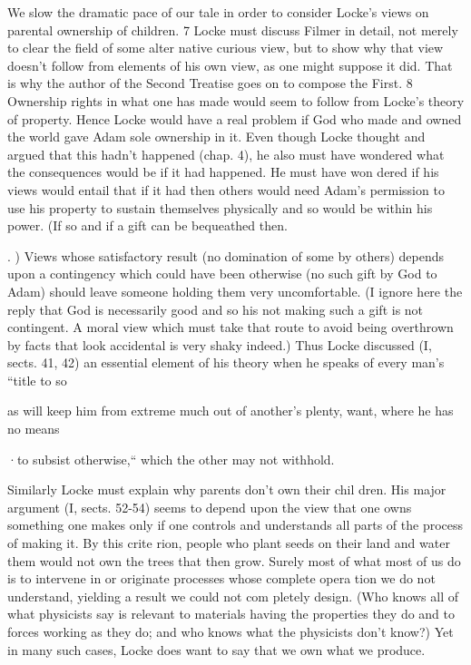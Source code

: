 \documentclass[11pt,openany]{book}
\begin{document}
We slow the dramatic pace of our tale in order to consider Locke's views on parental ownership of children. 7 Locke must discuss Filmer in detail, not merely to clear the field of some alter native curious view, but to show why that view doesn't follow from elements of his own view, as one might suppose it did. That is why the author of the Second Treatise goes on to compose the First. 8 Ownership rights in what one has made would seem to follow from Locke's theory of property. Hence Locke would have a real problem if God who made and owned the world gave Adam sole ownership in it. Even though Locke thought and argued that this hadn't happened (chap. 4), he also must have wondered what the consequences would be if it had happened. He must have won dered if his views would entail that if it had then others would need Adam's permission to use his property to sustain themselves physically and so would be within his power. (If so and if a gift can be bequeathed then. 

. ) Views whose satisfactory result (no domination of some by others) depends upon a contingency which could have been otherwise (no such gift by God to Adam) should leave someone holding them very uncomfortable. (I ignore here the reply that God is necessarily good and so his not making such a gift is not contingent. A moral view which must take that route to avoid being overthrown by facts that look accidental is very shaky indeed.) Thus Locke discussed (I, sects. 41, 42) an essential element of his theory when he speaks of every man's ``title to so 

as will keep him from extreme much out of another's plenty, want, where he has no means 

·to subsist otherwise,`` which the other may not withhold. 

Similarly Locke must explain why parents don't own their chil dren. His major argument (I, sects. 52-54) seems to depend upon the view that one owns something one makes only if one controls and understands all parts of the process of making it. By this crite rion, people who plant seeds on their land and water them would not own the trees that then grow. Surely most of what most of us do is to intervene in or originate processes whose complete opera tion we do not understand, yielding a result we could not com pletely design. (Who knows all of what physicists say is relevant to materials having the properties they do and to forces working as they do; and who knows what the physicists don't know?) Yet in many such cases, Locke does want to say that we own what we produce. 
\end{document}
